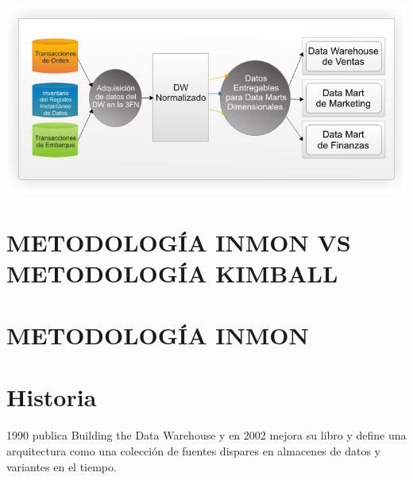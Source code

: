 \begin{center}
\includegraphics[width=16cm]{./Imagenes/image003}
\end{center}


\newpage


\section{METODOLOGÍA INMON VS METODOLOGÍA KIMBALL}


\section{METODOLOGÍA INMON}
\section{Historia}
1990 publica Building the Data Warehouse y en 2002 mejora su libro y define una arquitectura como una colección de fuentes dispares en almacenes de datos y variantes en el tiempo.
